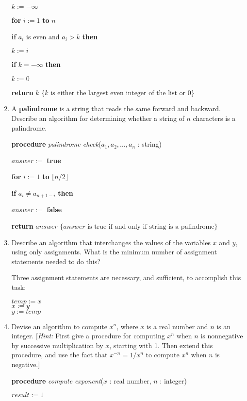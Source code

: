 \documentclass[11pt]{article}
\begin{document}
\begin{enumerate}[label=\textbf{\arabic*.}]
	$k := -\infty$
	
	\textbf{for} $i := 1$ \textbf{to} $n$
	
	\qquad \textbf{if} $a_i$ is even and $a_i > k$ \textbf{then}
		
	\qquad\qquad $k := i$
	
	\textbf{if} $k = -\infty$ \textbf{then}
	
	\qquad $k := 0$
	
	\textbf{return} $k$ $\{ k \text{ is either the largest even integer of the list or 0} \}$
	
	\item A \textbf{palindrome} is a string that reads the same forward and backward. Describe an algorithm for determining whether a string of $n$ characters is a palindrome.
	
	\textbf{procedure} \emph{palindrome check}($a_1, a_2, \ldots, a_n$ : string)
	
	$answer :=$ \textbf{true}
	
	\textbf{for} $i := 1$ \textbf{to} $\lfloor n / 2 \rfloor$
	
	\qquad \textbf{if} $a_i \ne a_{n + 1 - i}$ \textbf{then}
	
	\qquad\qquad $answer :=$ \textbf{false}
	
	\textbf{return} $answer$ $\{ answer \text{ is true if and only if string is a palindrome} \}$
	
	\item Describe an algorithm that interchanges the values of the variables $x$ and $y$, using only assignments. What is the minimum number of assignment statements needed to do this?
	
	Three assignment statements are necessary, and sufficient, to accomplish this task:
	
	$temp := x$ \\
	$x := y$ \\
	$y := temp$
	
	\item Devise an algorithm to compute $x^n$, where $x$ is a real number and $n$ is an integer. [\emph{Hint:} First give a procedure for computing $x^n$ when $n$ is nonnegative by successive multiplication by $x$, starting with 1. Then extend this procedure, and use the fact that $x^{-n} = 1 / x^n$ to compute $x^n$ when $n$ is negative.]

	\textbf{procedure} \emph{compute exponent}($x$ : real number, $n$ : integer)
	
	$result := 1$
	

\end{enumerate}
\end{document}
